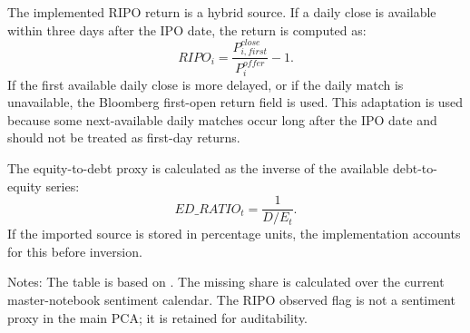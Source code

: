 \documentclass[12pt]{article}
\begin{document}
The implemented RIPO return is a hybrid source. If a daily close is available within three days after the IPO date, the return is computed as:
\[
RIPO_i = \frac{P^{close}_{i,first}}{P^{offer}_i} - 1.
\]
If the first available daily close is more delayed, or if the daily match is unavailable, the Bloomberg first-open return field is used. This adaptation is used because some next-available daily matches occur long after the IPO date and should not be treated as first-day returns.

The equity-to-debt proxy is calculated as the inverse of the available debt-to-equity series:
\[
ED\_RATIO_t = \frac{1}{D/E_t}.
\]
If the imported source is stored in percentage units, the implementation accounts for this before inversion.

\begin{table}[htbp]
\centering
\caption{Descriptive Statistics for Implemented Sentiment Proxies}
\label{tab:sentiment_proxy_descriptive_statistics}
\begin{minipage}{0.95\textwidth}
\footnotesize
Notes: The table is based on . The missing share is calculated over the current master-notebook sentiment calendar. The RIPO observed flag is not a sentiment proxy in the main PCA; it is retained for auditability.
\end{minipage}
\end{table}
\end{document}

